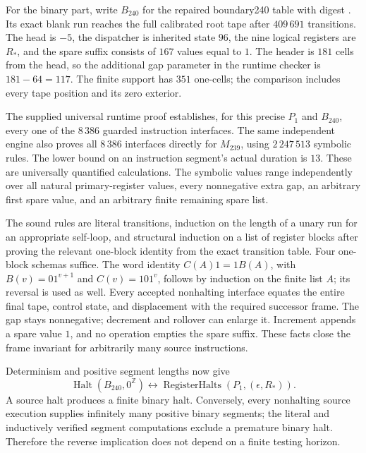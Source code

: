For the binary part, write $B_{240}$ for the repaired boundary240 table
with digest
.
Its exact blank run reaches the full calibrated root tape after
$409\,691$ transitions.  The head is $-5$, the dispatcher is inherited
state $96$, the nine logical registers are $R_*$, and the spare suffix
consists of $167$ values equal to $1$.  The header is $181$ cells from
the head, so the additional gap parameter in the runtime checker is
$181-64=117$.  The finite support has $351$ one-cells; the comparison
includes every tape position and its zero exterior.

The supplied universal runtime proof establishes, for this precise
$P_1$ and $B_{240}$, every one of the $8\,386$ guarded instruction
interfaces.  The same independent engine also proves all $8\,386$
interfaces directly for $M_{239}$, using $2\,247\,513$ symbolic rules.
The lower bound on an instruction segment's actual duration is $13$.
These are universally quantified calculations.  The symbolic values
range independently over all natural primary-register values, every
nonnegative extra gap, an arbitrary first spare value, and an arbitrary
finite remaining spare list.

The sound rules are literal transitions, induction on the length of a
unary run for an appropriate self-loop, and structural induction on a
list of register blocks after proving the relevant one-block identity
from the exact transition table.  Four one-block schemas suffice.  The
word identity $C(A)1=1B(A)$, with
$B(v)=01^{v+1}$ and $C(v)=101^v$, follows by induction on the finite
list $A$; its reversal is used as well.  Every accepted nonhalting
interface equates the entire final tape, control state, and displacement
with the required successor frame.  The gap stays nonnegative;
decrement and rollover can enlarge it.  Increment appends a spare value
$1$, and no operation empties the spare suffix.  These facts close the
frame invariant for arbitrarily many source instructions.

Determinism and positive segment lengths now give
\[
 \operatorname{Halt}(B_{240},0^\mathbb Z)
 \longleftrightarrow
 \operatorname{RegisterHalts}(P_1,(\epsilon,R_*)).
 \tag{R}
\]
A source halt produces a finite binary halt.  Conversely, every
nonhalting source execution supplies infinitely many positive binary
segments; the literal and inductively verified segment computations
exclude a premature binary halt.  Therefore the reverse implication
does not depend on a finite testing horizon.

